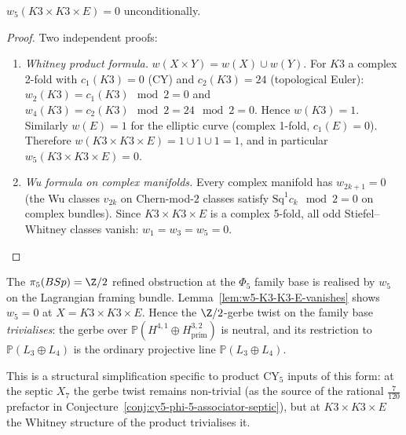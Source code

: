 \begin{lemma}
\label{lem:w5-K3-K3-E-vanishes}
$w_5(K3 \times K3 \times E) = 0$ unconditionally.
\end{lemma}

\begin{proof}
Two independent proofs:
\begin{enumerate}[label=\textup{(}\roman*\textup{)}]
 \item \emph{Whitney product formula.} $w(X \times Y) = w(X) \cup w(Y)$.
 For $K3$ a complex 2-fold with $c_1(K3) = 0$ \textup{(}CY\textup{)} and
 $c_2(K3) = 24$ \textup{(}topological Euler\textup{)}:
 $w_2(K3) = c_1(K3) \mod 2 = 0$ and $w_4(K3) = c_2(K3) \mod 2 = 24 \mod 2
 = 0$. Hence $w(K3) = 1$. Similarly $w(E) = 1$ for the elliptic curve
 \textup{(}complex 1-fold, $c_1(E) = 0$\textup{)}. Therefore
 $w(K3 \times K3 \times E) = 1 \cup 1 \cup 1 = 1$, and in particular
 $w_5(K3 \times K3 \times E) = 0$.

 \item \emph{Wu formula on complex manifolds.} Every complex manifold has
 $w_{2k+1} = 0$ \textup{(}the Wu classes $v_{2k}$ on Chern-mod-$2$ classes
 satisfy $\mathrm{Sq}^1 c_k \mod 2 = 0$ on complex bundles\textup{)}.
 Since $K3 \times K3 \times E$ is a complex 5-fold, all odd Stiefel--Whitney
 classes vanish: $w_1 = w_3 = w_5 = 0$. \qedhere
\end{enumerate}
\end{proof}

\begin{remark}
\label{rem:phi-5-K3-K3-E-gerbe-trivial}
The $\pi_5(BSp) = \Z/2$ refined obstruction at the $\Phi_5$ family base
is realised by $w_5$ on the Lagrangian framing bundle. Lemma~\ref{lem:w5-K3-K3-E-vanishes}
shows $w_5 = 0$ at $X = K3 \times K3 \times E$. Hence the $\Z/2$-gerbe twist
on the family base \emph{trivialises}: the gerbe over
\(\mathbb P(H^{4,1}\oplus H^{3,2}_{\mathrm{prim}})\) is neutral, and its
restriction to \(\mathbb P(L_3\oplus L_4)\) is the ordinary projective line
\(\mathbb P(L_3\oplus L_4)\).

This is a structural simplification specific to product CY${}_5$ inputs of
this form: at the septic $X_7$ the gerbe twist remains non-trivial
\textup{(}as the source of the rational $\tfrac{7}{120}$ prefactor in
Conjecture~\ref{conj:cy5-phi-5-associator-septic}\textup{)}, but at
$K3 \times K3 \times E$ the Whitney structure of the product trivialises it.
\end{remark}

